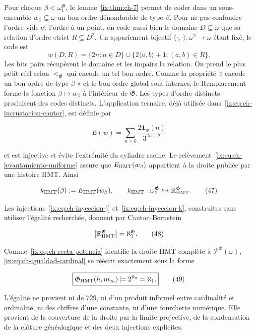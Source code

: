 Pour chaque \(\beta<\omega_1^{\mathfrak G}\), le lemme~\ref{ix:thm:ch-7} permet de coder dans un
sous-ensemble \(w_\beta\subseteq\omega\) un bon ordre dénombrable de type
\(\beta\). Pour ne pas confondre l’ordre vide et l’ordre à un point, on code
aussi bien le domaine \(D\subseteq\omega\) que sa relation d’ordre strict
\(R\subseteq D^2\). Un appariement bijectif
\(\langle\cdot,\cdot\rangle:\omega^2\to\omega\) étant fixé, le code est
\[
 w(D,R)=\{2n:n\in D\}\cup
        \{2\langle a,b\rangle+1:(a,b)\in R\}.
\]
Les bits pairs récupèrent le domaine et les impairs la relation. On prend le
plus petit réel selon \(<_{\mathfrak G}\) qui encode un tel bon ordre. Comme la propriété
« encode un bon ordre de type \(\beta\) » et le bon ordre global sont internes,
le Remplacement forme la fonction \(\beta\mapsto w_\beta\) à l’intérieur de
\(\mathfrak G\). Les types d’ordre distincts produisent des codes distincts.
L’application ternaire, déjà utilisée dans~\eqref{ix:eq:ch-incrustacion-cantor}, est définie par

\[
 E(w)=\sum_{n\ge0}\frac{2\mathbf1_w(n)}{3^{2n+2}}
\tag{46}\label{ix:eq:ch-incrustacion-ternaria}
\]

et est injective et évite l'extrémité du cylindre racine. Le relèvement~\eqref{ix:eq:ch-levantamiento-uniforme} assure que \(E_{\rm HMT}(w_\beta)\) appartient à la droite publiée par une histoire HMT. Ainsi

\[
 k_{\rm HMT}(\beta):=E_{\rm HMT}(w_\beta),
 \qquad
 k_{\rm HMT}:\omega_1^{\mathfrak G}
 \hookrightarrow\mathbb R_{\rm HMT}^{\mathfrak G}.
\tag{47}\label{ix:eq:ch-inyeccion-k}
\]

Les injections~\eqref{ix:eq:ch-inyeccion-j} et~\eqref{ix:eq:ch-inyeccion-k}, construites sans utiliser l’égalité recherchée,
donnent par Cantor--Bernstein

\[
 \bigl|\mathbb R_{\rm HMT}^{\mathfrak G}\bigr|
 =\aleph_1^{\mathfrak G}.
\tag{48}\label{ix:eq:ch-igualdad-cardinal}
\]

Comme~\eqref{ix:eq:ch-recta-potencia} identifie la droite HMT complète à
\(\mathcal P^{\mathfrak G}(\omega)\), \eqref{ix:eq:ch-igualdad-cardinal} se réécrit exactement sous la forme

\[
 \boxed{
  \mathfrak G_{\rm HMT}(h,m_\infty)
  \models 2^{\aleph_0}=\aleph_1.}
\tag{49}\label{ix:eq:ch-decision}
\]

L'égalité ne provient ni de \(729\), ni d'un produit informel entre cardinalité et ordinalité, ni des chiffres d'une constante, ni d'une fourchette numérique. Elle provient de la couverture de la droite par la limite projective, de la condensation de la clôture généalogique et des deux injections explicites.

